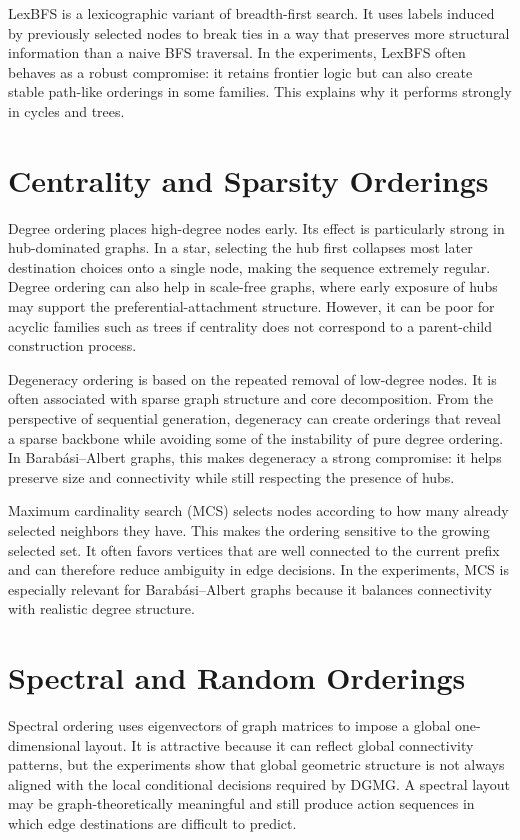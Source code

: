 LexBFS is a lexicographic variant of breadth-first search. It uses labels induced by previously selected nodes to break ties in a way that preserves more structural information than a naive BFS traversal. In the experiments, LexBFS often behaves as a robust compromise: it retains frontier logic but can also create stable path-like orderings in some families. This explains why it performs strongly in cycles and trees.

\section{Centrality and Sparsity Orderings}
\label{sec:centrality-sparsity-orderings}

Degree ordering places high-degree nodes early. Its effect is particularly strong in hub-dominated graphs. In a star, selecting the hub first collapses most later destination choices onto a single node, making the sequence extremely regular. Degree ordering can also help in scale-free graphs, where early exposure of hubs may support the preferential-attachment structure. However, it can be poor for acyclic families such as trees if centrality does not correspond to a parent-child construction process.

Degeneracy ordering is based on the repeated removal of low-degree nodes. It is often associated with sparse graph structure and core decomposition. From the perspective of sequential generation, degeneracy can create orderings that reveal a sparse backbone while avoiding some of the instability of pure degree ordering. In Barab\'asi--Albert graphs, this makes degeneracy a strong compromise: it helps preserve size and connectivity while still respecting the presence of hubs.

Maximum cardinality search (MCS) selects nodes according to how many already selected neighbors they have. This makes the ordering sensitive to the growing selected set. It often favors vertices that are well connected to the current prefix and can therefore reduce ambiguity in edge decisions. In the experiments, MCS is especially relevant for Barab\'asi--Albert graphs because it balances connectivity with realistic degree structure.

\section{Spectral and Random Orderings}
\label{sec:spectral-random-orderings}

Spectral ordering uses eigenvectors of graph matrices to impose a global one-dimensional layout. It is attractive because it can reflect global connectivity patterns, but the experiments show that global geometric structure is not always aligned with the local conditional decisions required by DGMG. A spectral layout may be graph-theoretically meaningful and still produce action sequences in which edge destinations are difficult to predict.

